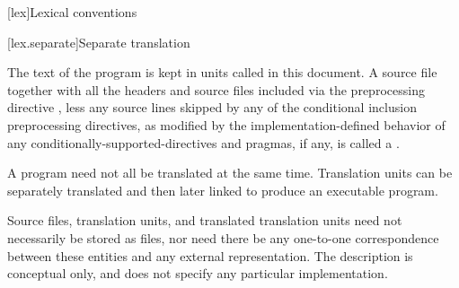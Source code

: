 [lex]{Lexical conventions}



[lex.separate]{Separate translation}

\pnum
{}%
%
The text of the program is kept in units called
 in this document.
A source file together with all the headers
and source files included via the preprocessing
directive , less any source lines skipped by any of the
conditional inclusion preprocessing directives,
as modified by the implementation-defined behavior of any
conditionally-supported-directives and pragmas,
if any, is
called a .
\begin{note}
A \Cpp{} program need not all be translated at the same time.
Translation units can be separately translated and then later linked
to produce an executable program.
\end{note}
\begin{note}
Source files, translation units, and translated translation units
need not necessarily be stored as files, nor need there be any one-to-one
correspondence between these entities and any external representation.
The description is conceptual only,
and does not specify any particular implementation.
\end{note}

